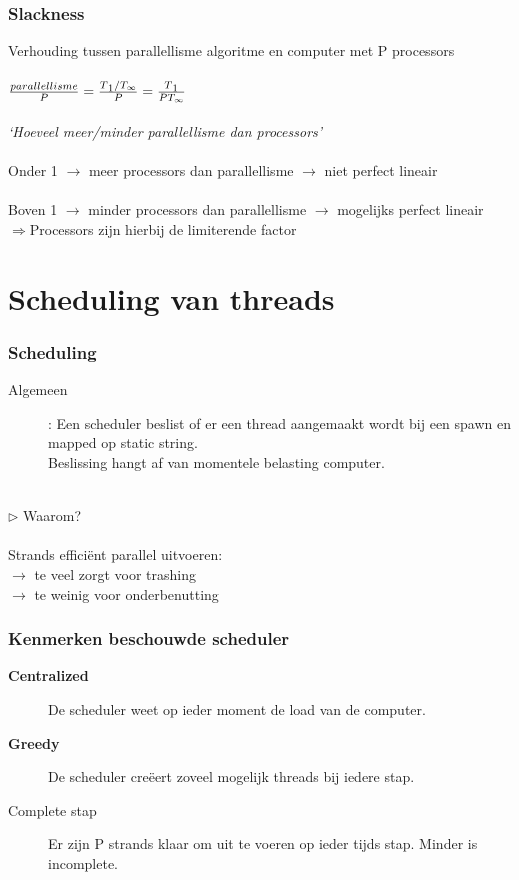 \documentclass
   [kulak] %
   {kulakbeamer}
\begin{document}
\begin{frame}
	\frametitle{Slackness}
	Verhouding tussen parallellisme algoritme en computer met P processors\\~\\
	$\frac{parallellisme}{P} = \frac{T\textsubscript{1}/T_\infty}{P} =  \frac{T\textsubscript{1}}{PT_\infty}$ ~\\~\\
	\textit{`Hoeveel meer/minder parallellisme dan processors'}\\~\\
	Onder 1 $\rightarrow$ meer processors dan parallellisme $\rightarrow$ niet perfect lineair \\~\\
	Boven 1 $\rightarrow$ minder processors dan parallellisme $\rightarrow$ mogelijks perfect lineair \\ $\Rightarrow$Processors zijn hierbij de limiterende factor
\end{frame}

\section[Scheduling]{Scheduling van threads}

\begin{frame}
\frametitle{Scheduling}
\begin{description}
\item
 [Algemeen]: Een scheduler beslist of er een thread aangemaakt wordt bij een spawn en mapped op static string.\\Beslissing hangt af van momentele belasting computer.\\~\\ 
\end{description}
$\triangleright$ Waarom? \\~\\ Strands efficiënt parallel uitvoeren:\\
$\rightarrow$ te veel zorgt voor trashing \\
$\rightarrow$ te weinig voor onderbenutting
\end{frame}

\begin{frame}
	\frametitle{Kenmerken beschouwde scheduler}
	\begin{description}
		\item[\textbf{Centralized}] De scheduler weet op ieder moment de load van de computer.
		\item[\textbf{Greedy}] De scheduler creëert zoveel mogelijk threads bij iedere stap.
		\item[Complete stap] Er zijn P strands klaar om uit te voeren op ieder tijds stap. Minder is incomplete.
	\end{description}
\end{frame}
\end{document}
